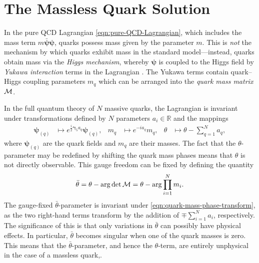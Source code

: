 \section{The Massless Quark Solution}


In the pure QCD Lagrangian \eqref{eqn:pure-QCD-Lagrangian}, which includes the mass term $m\bar{\bm\psi}\bm\psi$, quarks possess mass given by the parameter $m$.
This is \emph{not} the mechanism by which quarks exhibit mass in the standard model---instead, quarks obtain mass via the \emph{Higgs mechanism}, whereby $\bm\psi$ is coupled to the Higgs field by \emph{Yukawa interaction} terms in the Lagrangian \cite[§~7.6.6]{Hamilton_2017}.
The Yukawa terms contain quark--Higgs coupling parameters $m_q$ which can be arranged into the \emph{quark mass matrix} $\cal M$.


In the full quantum theory of $N$ massive quarks, the Lagrangian is invariant under transformations defined by $N$ parameters $a_i \in \mathds{R}$ and the mappings
\begin{align}
	\bm\psi_{(q)} &\mapsto e^{\frac{i}2\bm γ_5a_q}\bm\psi_{(q)}
,&	m_q &\mapsto e^{-ia_q}m_q
,&	\theta &\mapsto \theta - \sum_{q=1}^N a_q
\label{eqn:quark-mass-phase-transform}
,\end{align}
where $\bm\psi_{(q)}$ are the quark fields and $m_q$ are their masses.
The fact that the $\theta$-parameter may be redefined by shifting the quark mass phases means that $\theta$ is not directly observable.
This gauge freedom can be fixed by defining the quantity
\begin{align}
	\bar\theta
	= \theta - \arg\det\cal M
	= \theta - \arg\prod_{i=1}^Nm_i
.\end{align}
The gauge-fixed $\bar\theta$-parameter is invariant under \eqref{eqn:quark-mass-phase-transform}, as the two right-hand terms transform by the addition of $\mp\sum_{i=1}^Na_i$, respectively.
The significance of this is that only variations in $\bar\theta$ can possibly have physical effects.
In particular, $\bar\theta$ becomes singular when one of the quark masses is zero.
This means that the $\bar\theta$-parameter, and hence the $\theta$-term, are entirely unphysical in the case of a massless quark,.

